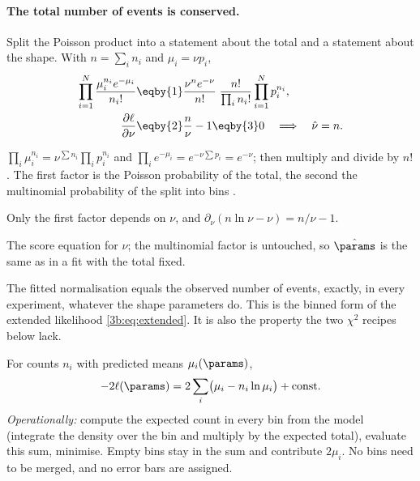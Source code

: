 \paragraph{The total number of events is conserved.}
Split the Poisson product into a statement about the total and a
statement about the shape. With $n=\sum_in_i$ and $\mu_i=\nu p_i$,
\begin{align}
  \prod_{i=1}^N\frac{\mu_i^{n_i}e^{-\mu_i}}{n_i!}
  &\eqby{1}\frac{\nu^{n}e^{-\nu}}{n!}\;
   \frac{n!}{\prod_in_i!}\prod_{i=1}^Np_i^{n_i},
  \label{3b:eq:poisson-split}\\
  \frac{\partial\ell}{\partial\nu}
  &\eqby{2}\frac{n}{\nu}-1\eqby{3}0
  \quad\Longrightarrow\quad\hat\nu=n .
  \nonumber
\end{align}
\begin{explain}
  \item $\prod_i\mu_i^{n_i}=\nu^{\sum n_i}\prod_ip_i^{n_i}$ and
        $\prod_ie^{-\mu_i}=e^{-\nu\sum p_i}=e^{-\nu}$; then multiply and
        divide by $n!$. The first factor is the Poisson probability of the
        total, the second the multinomial probability of the split into bins
        .
  \item Only the first factor depends on $\nu$, and
        $\partial_\nu(n\ln\nu-\nu)=n/\nu-1$.
  \item The score equation for $\nu$; the multinomial factor is untouched,
        so $\hat\params$ is the same as in a fit with the total fixed.
\end{explain}
The fitted normalisation equals the observed number of events, exactly, in
every experiment, whatever the shape parameters do. This is the binned form
of the extended likelihood \eqref{3b:eq:extended}. It is also the property
the two $\chi^2$ recipes below lack.

\begin{workdef}
For counts $n_i$ with predicted means $\mu_i(\params)$,
\[
  -2\ell(\params)=2\sum_i\bigl(\mu_i-n_i\ln\mu_i\bigr)+\text{const}.
\]
\emph{Operationally:} compute the expected count in every bin from the
model (integrate the density over the bin and multiply by the expected
total), evaluate this sum, minimise. Empty bins stay in the sum and
contribute $2\mu_i$. No bins need to be merged, and no error bars are
assigned.
\end{workdef}

